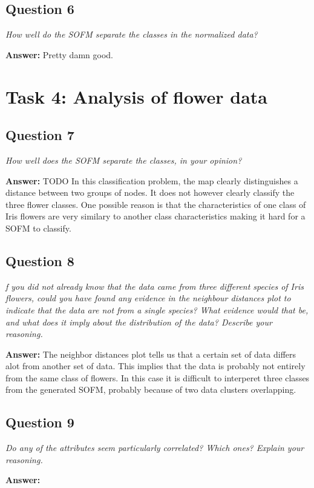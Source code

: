 \documentclass[a4paper]{article}
\begin{document}
\subsection*{Question 6}
\emph{How well do the SOFM separate the classes in the normalized
data?}

\textbf{Answer:} 
Pretty damn good.

\section*{Task 4: Analysis of flower data}

\subsection*{Question 7}
\emph{How well does the SOFM separate the classes, in your opinion?}

\textbf{Answer: } TODO In this classification problem, the map clearly distinguishes a distance between two groups of nodes. It does not however clearly classify the three flower classes. One possible reason is that the characteristics of one class of Iris flowers are very similary to another class characteristics making it hard for a SOFM to classify. 

\subsection*{Question 8}
\emph{f you did not already know that the data came from three different species of Iris flowers, could you have found any evidence in the neighbour distances plot to indicate that the data are not from a single species? What evidence would that be, and what does it imply about the distribution of the data?
Describe your reasoning.}

\textbf{Answer:} The neighbor distances plot tells us that a certain set of data differs alot from another set of data. This implies that the data is probably not entirely from the same class of flowers. In this case it is difficult to interperet three classes from the generated SOFM, probably because of two data clusters 
overlapping. 

\subsection*{Question 9}
\emph{Do any of the attributes seem particularly correlated? Which
ones? Explain your reasoning.}

\textbf{Answer:}  
\end{document}
